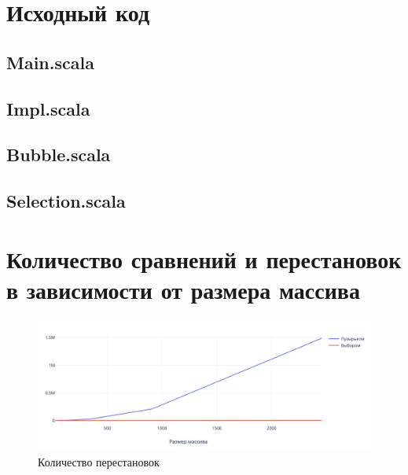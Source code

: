 \documentclass[a4paper,14pt,russian]{report}
\begin{document}
\section{Исходный код}

\subsection{Main.scala}



\newpage

\subsection{Impl.scala}



\newpage

\subsection{Bubble.scala}



\newpage

\subsection{Selection.scala}



\section{Количество сравнений и перестановок в зависимости от размера массива}

\begin{figure}[!htb]
\centerline{\includegraphics[width=1\textwidth]{swaps}}
\caption{Количество перестановок}
\end{figure}
\end{document}
